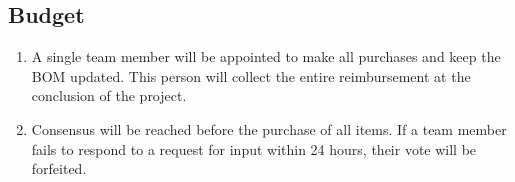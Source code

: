 \documentclass[a4paper]{article}
\begin{document}
\subsection{Budget}
\begin{enumerate}[label=(\alph*)]
	\item A single team member will be appointed to make all purchases and keep the BOM updated. This person will collect the entire reimbursement at the conclusion of the project.
	\item Consensus will be reached before the purchase of all items. If a team member fails to respond to a request for input within 24 hours, their vote will be forfeited.
\end{enumerate}
\end{document}
